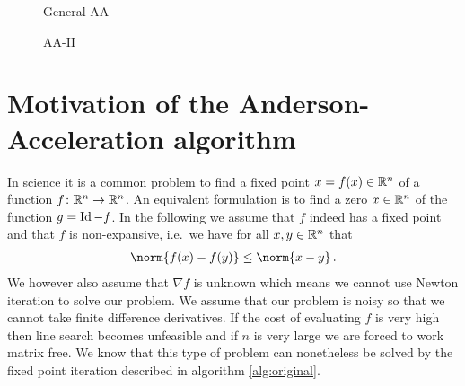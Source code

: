 \begin{figure}[b]
\centering
\begin{minipage}{0.41\textwidth}
\begin{algorithm}[H]
\caption{General AA}
\label{alg:aai}


\BlankLine
{}
\end{algorithm}
\end{minipage}
\hfill
\begin{minipage}{0.58\textwidth}
\begin{algorithm}[H]
\caption{AA-II}
\label{alg:aa2}

\BlankLine
{}
\end{algorithm}
\end{minipage}
\end{figure}


\section{Motivation of the Anderson-Acceleration algorithm}

In science it is a common problem to find a fixed point $x=f(x)\in\mathbb{R}^n$ of a function $f\colon\mathbb{R}^n\to\mathbb{R}^n$. An equivalent formulation is to find a zero $x\in\mathbb{R}^n$ of the function $g=\operatorname{Id}-f$. In the following we assume that $f$ indeed has a fixed point and that $f$ is non-expansive, i.e.\ we have for all $x,y\in\mathbb{R}^n$ that
\begin{align*}
	\norm{f(x)-f(y)}\leq\norm{x-y}\,.
\end{align*}
We however also assume that $\nabla f$ is unknown which means we cannot use Newton iteration to solve our problem. We assume that our problem is noisy so that we cannot take finite difference derivatives. If the cost of evaluating $f$ is very high then line search becomes unfeasible and if $n$ is very large we are forced to work matrix free. We know that this type of problem can nonetheless be solved by the fixed point iteration described in algorithm \ref{alg:original}.

